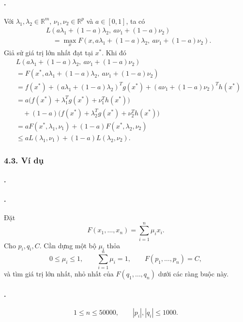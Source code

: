 \documentclass[11pt]{article}
\begin{document}
\paragraph{.}
Với \(\lambda_1,\lambda_2\in\mathbb R^m\), \(\nu_1,\nu_2\in\mathbb R^p\) và
\(a\in[0,1]\), ta có
\[
\begin{aligned}
&L(a\lambda_1+(1-a)\lambda_2,\ a\nu_1+(1-a)\nu_2)\\
&\quad=\max_x F(x,a\lambda_1+(1-a)\lambda_2,\ a\nu_1+(1-a)\nu_2).
\end{aligned}
\]
Giả sử giá trị lớn nhất đạt tại \(x^\ast\). Khi đó
\[
\begin{aligned}
&L(a\lambda_1+(1-a)\lambda_2,\ a\nu_1+(1-a)\nu_2)\\
&=F(x^\ast,a\lambda_1+(1-a)\lambda_2,\ a\nu_1+(1-a)\nu_2)\\
&=f(x^\ast)+(a\lambda_1+(1-a)\lambda_2)^Tg(x^\ast)
 +(a\nu_1+(1-a)\nu_2)^Th(x^\ast)\\
&=a\bigl(f(x^\ast)+\lambda_1^Tg(x^\ast)+\nu_1^Th(x^\ast)\bigr)\\
&\quad +(1-a)\bigl(f(x^\ast)+\lambda_2^Tg(x^\ast)+\nu_2^Th(x^\ast)\bigr)\\
&=aF(x^\ast,\lambda_1,\nu_1)+(1-a)F(x^\ast,\lambda_2,\nu_2)\\
&\le aL(\lambda_1,\nu_1)+(1-a)L(\lambda_2,\nu_2).
\end{aligned}
\]

\subsubsection*{4.3. Ví dụ}

\paragraph{.}
\paragraph{.}
Đặt
\[
  F(x_1,\ldots,x_n)=\sum_{i=1}^{n}\mu_i x_i.
\]
Cho \(p_i,q_i,C\). Cần dựng một bộ \(\mu_i\) thỏa
\[
  0\le \mu_i\le 1,\qquad \sum_{i=1}^{n}\mu_i=1,\qquad
  F(p_1,\ldots,p_n)=C,
\]
và tìm giá trị lớn nhất, nhỏ nhất của \(F(q_1,\ldots,q_n)\) dưới các ràng buộc
này.

\paragraph{.}
\[
  1\le n\le 50000,\qquad |p_i|,|q_i|\le 1000.
\]
\end{document}
